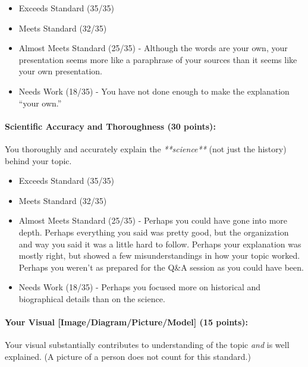 \documentclass[11pt]{exam}
\begin{document}
\begin{itemize}
  \item Exceeds Standard (35/35)
  \item Meets Standard (32/35)
  \item Almost Meets Standard (25/35) - 
    Although the words are your own, your presentation seems more like a paraphrase of your sources than it seems like your own presentation. 
  \item Needs Work (18/35) -
    You have not done enough to make the explanation ``your own.''
  
\end{itemize}



\paragraph{Scientific Accuracy and Thoroughness (30 points):} 
  You thoroughly and accurately explain the \emph{**science**} (not just the history) behind your topic.
  

\begin{itemize}
  \item Exceeds Standard (35/35)
  \item Meets Standard (32/35)
  \item Almost Meets Standard (25/35) - 
    Perhaps you could have gone into more depth.  Perhaps everything you said was pretty good, but the organization and way you said it was a little hard to follow.  Perhaps your explanation was mostly right, but showed a few misunderstandings in how your topic worked.  Perhaps you weren't as prepared for the Q\&A session as you could have been.
  \item Needs Work (18/35) -
    Perhaps you focused more on historical and biographical details than on the science.
  
\end{itemize}



\paragraph{Your Visual [Image/Diagram/Picture/Model] (15 points): } 
  Your visual substantially contributes to understanding of the topic \emph{and} is well explained. (A picture of a person does not count for this standard.) 
  
\end{document}
